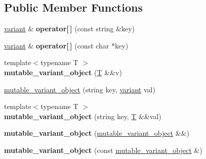 \subsection*{Public Member Functions}
\begin{DoxyCompactItemize}
\item 
\mbox{\label{classfc_1_1mutable__variant__object_a686fa5ef8b868de88e082ac901b1bb63}} 
\mbox{\hyperlink{classfc_1_1variant}{variant}} \& {\bfseries operator\mbox{[}$\,$\mbox{]}} (const string \&key)
\item 
\mbox{\label{classfc_1_1mutable__variant__object_ad35da3501e3996a3ee8e78dca04dcdf9}} 
\mbox{\hyperlink{classfc_1_1variant}{variant}} \& {\bfseries operator\mbox{[}$\,$\mbox{]}} (const char $\ast$key)
\item 
\mbox{\label{classfc_1_1mutable__variant__object_a9174ede4cf12018a50539611ee60b327}} 
{\footnotesize template$<$typename T $>$ }\\{\bfseries mutable\+\_\+variant\+\_\+object} (\mbox{\hyperlink{struct_t}{T}} \&\&v)
\item 
\mbox{\hyperlink{classfc_1_1mutable__variant__object_aad0bfd86a84c14612685df931e43a67a}{mutable\+\_\+variant\+\_\+object}} (string key, \mbox{\hyperlink{classfc_1_1variant}{variant}} val)
\item 
\mbox{\label{classfc_1_1mutable__variant__object_a0a04e324ffa2723ed554fbc563932427}} 
{\footnotesize template$<$typename T $>$ }\\{\bfseries mutable\+\_\+variant\+\_\+object} (string key, \mbox{\hyperlink{struct_t}{T}} \&\&val)
\item 
\mbox{\label{classfc_1_1mutable__variant__object_a092bf4693b06cbe867239410ea780818}} 
{\bfseries mutable\+\_\+variant\+\_\+object} (\mbox{\hyperlink{classfc_1_1mutable__variant__object}{mutable\+\_\+variant\+\_\+object}} \&\&)
\item 
\mbox{\label{classfc_1_1mutable__variant__object_ac73e3697d6dcf342320c88f393df2448}} 
{\bfseries mutable\+\_\+variant\+\_\+object} (const \mbox{\hyperlink{classfc_1_1mutable__variant__object}{mutable\+\_\+variant\+\_\+object}} \&)

\end{DoxyCompactItemize}
